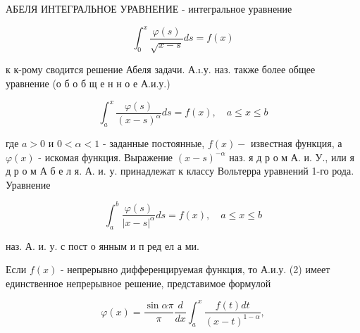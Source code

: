 \documentclass[10pt]{article}
\begin{document}
АБЕЛЯ ИНТЕГРАЛЬНОЕ УРАВНЕНИЕ - интегральное уравнение



\[

\int_{0}^{x} \frac{\varphi(s)}{\sqrt{x-s}} d s=f(x)

\]



к к-рому сводится решение Абеля задачи. А.ı.у. наз. также более общее уравнение (о б о б щ е н н о е А.и.у.)



\[

\int_{a}^{x} \frac{\varphi(s)}{(x-s)^{\alpha}} d s=f(x), \quad a \leqslant x \leqslant b

\]



где $a>0$ и $0<\alpha<1$ - заданные постоянные, $f(x)-$ известная функция, а $\varphi(x)$ - искомая функция. Выражение $(x-s)^{-\alpha}$ наз. я д р о м А. и. У., или я д р о м А б е л я. А. и. у. принадлежат к классу Вольтерра уравнений 1-го рода. Уравнение



\[

\int_{a}^{b} \frac{\varphi(s)}{|x-s|^{\alpha}} d s=f(x), \quad a \leqslant x \leqslant b

\]



наз. А. и. у. с пост о янным и п ред ел а ми.



Если $f(x)$ - непрерывно дифференцируемая функция, то А.и.у. (2) имеет единственное непрерывное решение, представимое формулой



\[

\varphi(x)=\frac{\sin \alpha \pi}{\pi} \frac{d}{d x} \int_{a}^{x} \frac{f(t) d t}{(x-t)^{1-\alpha}},

\]
\end{document}
